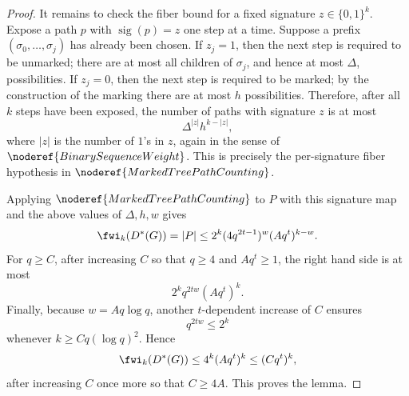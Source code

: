 \begin{proof}
It remains to check the fiber bound for a fixed signature
\(z\in\{0,1\}^k\).  Expose a path \(p\) with \(\operatorname{sig}(p)=z\)
one step at a time.  Suppose a prefix
\((\sigma_0,\ldots,\sigma_j)\) has already been chosen.  If \(z_j=1\), then
the next step is required to be unmarked; there are at most all children of
\(\sigma_j\), and hence at most \(\Delta\), possibilities.  If \(z_j=0\),
then the next step is required to be marked; by the construction of the
marking there are at most \(h\) possibilities.  Therefore, after all \(k\)
steps have been exposed, the number of paths with signature \(z\) is at most
\[
  \Delta^{|z|}h^{k-|z|},
\]
where \(|z|\) is the number of \(1\)'s in \(z\), again in the sense of
\(\noderef{BinarySequenceWeight}\).  This is precisely the per-signature
fiber hypothesis in \(\noderef{MarkedTreePathCounting}\).

Applying \(\noderef{MarkedTreePathCounting}\) to \(P\) with this signature map
and the above values of \(\Delta,h,w\) gives
\[
  \fwi_k(D^*(G))=|P|
  \le
  2^k(4q^{2t-1})^w(Aq^t)^{k-w}.
\]
For \(q\ge C\), after increasing \(C\) so that \(q\ge4\) and \(Aq^t\ge1\),
the right hand side is at most
\[
  2^k q^{2tw}(Aq^t)^k.
\]
Finally, because \(w=Aq\log q\), another \(t\)-dependent increase of \(C\)
ensures
\[
  q^{2tw}\le2^k
\]
whenever \(k\ge Cq(\log q)^2\).  Hence
\[
  \fwi_k(D^*(G))\le4^k(Aq^t)^k\le(Cq^t)^k,
\]
after increasing \(C\) once more so that \(C\ge4A\).  This proves the lemma.
\end{proof}
